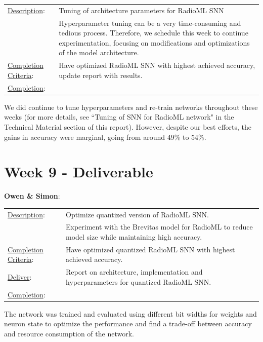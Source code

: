 \documentclass[parskip=true, 10pt]{scrartcl}
\begin{document}
\begin{tabularx}{\textwidth}{p{3.5cm} p{10cm}}
\underline{Description}: & Tuning of architecture parameters for RadioML SNN\\

& Hyperparameter tuning can be a very time-consuming and tedious process. Therefore, we schedule this week to continue
experimentation, focusing on modifications and optimizations of the model architecture.\\

\underline{Completion Criteria}: & Have optimized RadioML SNN with highest achieved accuracy, update report with results.\\
\underline{Completion}: &
\end{tabularx}

We did continue to tune hyperparameters and re-train networks throughout these weeks (for more details, see ``Tuning of SNN for RadioML network" in the Technical Material section of this report). However, despite our best efforts, the gains in accuracy were marginal, going from around 49\% to 54\%.

\section*{Week 9 - Deliverable}

\textsf{\textbf{Owen \& Simon}}:

\begin{tabularx}{\textwidth}{p{3.5cm} p{10cm}}
\underline{Description}: & Optimize quantized version of RadioML SNN.\\

& Experiment with the Brevitas model for RadioML to reduce model size while maintaining high accuracy.\\

\underline{Completion Criteria}: & Have optimized quantized RadioML SNN with highest achieved accuracy.\\

\underline{Deliver}: &  Report on architecture, implementation and hyperparameters for quantized RadioML SNN.\\
\underline{Completion}: &
\end{tabularx}

The network was trained and evaluated using different bit widths for weights and neuron state to optimize the performance and find a trade-off between accuracy and resource consumption of the network. 
\end{document}
